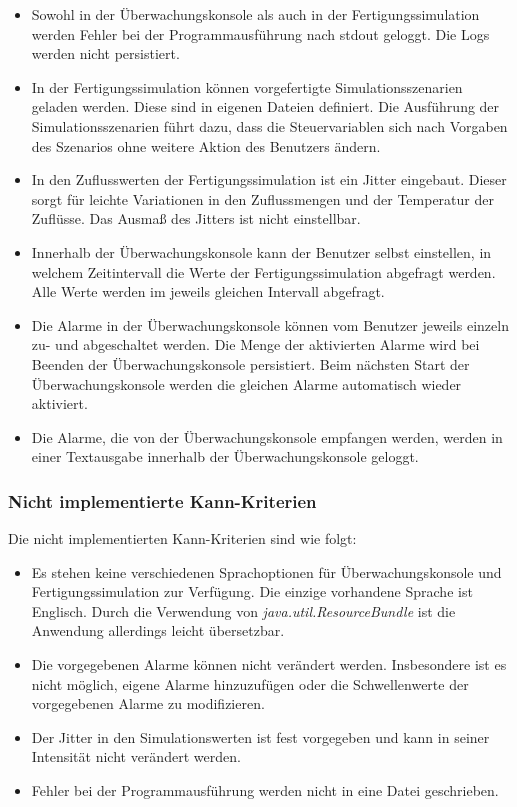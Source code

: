 \documentclass[parskip=full]{scrartcl}
\begin{document}
\begin{itemize}
    \item Sowohl in der \"Uberwachungskonsole als auch in der Fertigungssimulation werden Fehler bei der Programmausf\"uhrung
    nach stdout geloggt. Die Logs werden nicht persistiert.
    \item In der Fertigungssimulation k\"onnen vorgefertigte Simulationsszenarien geladen werden. Diese sind in eigenen Dateien definiert.
    Die Ausführung der Simulationsszenarien f\"uhrt dazu, dass die Steuervariablen sich nach Vorgaben des Szenarios ohne
    weitere Aktion des Benutzers \"andern.
    \item In den Zuflusswerten der Fertigungssimulation ist ein Jitter eingebaut. Dieser sorgt f\"ur leichte Variationen in den
    Zuflussmengen und der Temperatur der Zufl\"usse. Das Ausma{\ss} des Jitters ist nicht einstellbar.
    \item Innerhalb der \"Uberwachungskonsole kann der Benutzer selbst einstellen, in welchem Zeitintervall die Werte der
    Fertigungssimulation abgefragt werden. Alle Werte werden im jeweils gleichen Intervall abgefragt.
    \item Die Alarme in der \"Uberwachungskonsole k\"onnen vom Benutzer jeweils einzeln zu- und abgeschaltet werden. Die Menge der
    aktivierten Alarme wird bei Beenden der \"Uberwachungskonsole persistiert. Beim n\"achsten Start der \"Uberwachungskonsole
    werden die gleichen Alarme automatisch wieder aktiviert.
    \item Die Alarme, die von der \"Uberwachungskonsole empfangen werden, werden in einer Textausgabe innerhalb der
    \"Uberwachungskonsole geloggt.
\end{itemize}

\subsubsection{Nicht implementierte Kann-Kriterien}
Die nicht implementierten Kann-Kriterien sind wie folgt:

\begin{itemize}
    \item Es stehen keine verschiedenen Sprachoptionen f\"ur \"Uberwachungskonsole und Fertigungssimulation zur Verf\"ugung.
    Die einzige vorhandene Sprache ist Englisch. Durch die Verwendung von \emph{java.util.ResourceBundle} ist die Anwendung allerdings leicht übersetzbar.
    \item Die vorgegebenen Alarme k\"onnen nicht ver\"andert werden. Insbesondere ist es nicht m\"oglich, eigene Alarme hinzuzuf\"ugen
    oder die Schwellenwerte der vorgegebenen Alarme zu modifizieren.
    \item Der Jitter in den Simulationswerten ist fest vorgegeben und kann in seiner Intensit\"at nicht ver\"andert werden.
    \item Fehler bei der Programmausf\"uhrung werden nicht in eine Datei geschrieben.
\end{itemize}
\end{document}
